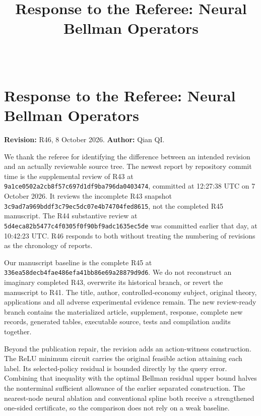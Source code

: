 \documentclass[ecta,nameyear,draft]{econsocart}
\begin{document}
\begin{frontmatter}\title{Response to the Referee: Neural Bellman Operators}
\begin{aug}\author[id=au1,addressref={add1}]{~}\address[id=add1]{Peking University}\end{aug}
\end{frontmatter}
\hypertarget{response-to-the-referee-neural-bellman-operators}{%
\section{Response to the Referee: Neural Bellman
Operators}\label{response-to-the-referee-neural-bellman-operators}}

\textbf{Revision:} R46, 8 October 2026. \textbf{Author:} Qian QI.

We thank the referee for identifying the difference between an intended
revision and an actually reviewable source tree. The newest report by
repository commit time is the supplemental review of R43 at
\nolinkurl{9a1ce0502a2cb8f57c697d1df9ba796da0403474}, committed at 12:27:38
UTC on 7 October 2026. It reviews the incomplete R43 snapshot
\nolinkurl{3c9ad7a969bddf3c79ec5dc07e4b74704fed8615}, not the completed R45
manuscript. The R44 substantive review at
\nolinkurl{5d4eca82b5477c4f0305f0f90bf9adc1635ec5de} was committed earlier
that day, at 10:42:23 UTC. R46 responds to both without treating the
numbering of revisions as the chronology of reports.

Our manuscript baseline is the complete R45 at
\nolinkurl{336ea58decb4fae486efa41bb86e69a28879d9d6}. We do not reconstruct
an imaginary completed R43, overwrite its historical branch, or revert
the manuscript to R41. The title, author, controlled-economy subject,
original theory, applications and all adverse experimental evidence
remain. The new review-ready branch contains the materialized article,
supplement, response, complete new records, generated tables, executable
source, tests and compilation audits together.

Beyond the publication repair, the revision adds an action-witness
construction. The ReLU minimum circuit carries the original feasible
action attaining each label. Its selected-policy residual is bounded
directly by the query error. Combining that inequality with the optimal
Bellman residual upper bound halves the nonterminal sufficient allowance
of the earlier separated construction. The nearest-node neural ablation
and conventional spline both receive a strengthened one-sided
certificate, so the comparison does not rely on a weak baseline.
\end{document}
